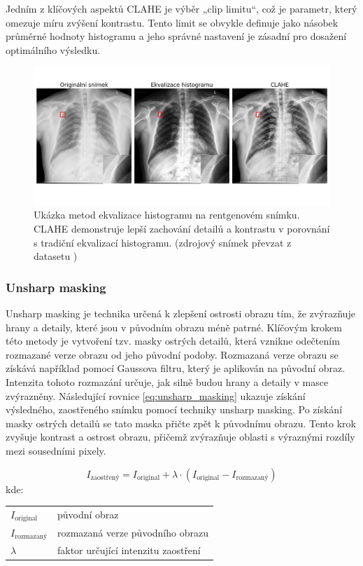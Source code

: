 \documentclass[male,czech,api_ing]{thesis}
\makeatletter
\newenvironment{conditions}[1][kde:]
    {#1 \begin{tabular}[t]{>{$}l<{$} @{${}={}$} >{\raggedright\arraybackslash}p{10cm}}}
    {\end{tabular}}
\makeatother
\begin{document}
Jedním z klíčových aspektů CLAHE je výběr „clip limitu“, což je parametr, který omezuje míru zvýšení kontrastu. Tento limit se obvykle definuje jako násobek průměrné hodnoty histogramu a jeho správné nastavení je zásadní pro dosažení optimálního výsledku. \cite{GraphicsGems}

\begin{figure}[h]
    \centering
    \includegraphics[width=\linewidth]{Prilohy/Obrazky/ImageEnhancement.png}
    \caption{Ukázka metod ekvalizace histogramu na rentgenovém snímku. CLAHE demonstruje lepší zachování detailů a kontrastu v porovnání s tradiční ekvalizací histogramu. (zdrojový snímek převzat z datasetu \cite{LungDataset})}
    \label{fig:histogram_equalization}
\end{figure}

\subsubsection{Unsharp masking}
Unsharp masking je technika určená k zlepšení ostrosti obrazu tím, že zvýrazňuje hrany a detaily, které jsou v původním obrazu méně patrné. Klíčovým krokem této metody je vytvoření tzv. masky ostrých detailů, která vznikne odečtením rozmazané verze obrazu od jeho původní podoby. Rozmazaná verze obrazu se získává například pomocí Gaussova filtru, který je aplikován na původní obraz. Intenzita tohoto rozmazání určuje, jak silně budou hrany a detaily v masce zvýrazněny. Následující rovnice \ref{eq:unsharp_masking} ukazuje získání výsledného, zaostřeného snímku pomocí techniky unsharp masking. Po získání masky ostrých detailů se tato maska přičte zpět k původnímu obrazu. Tento krok zvyšuje kontrast a ostrost obrazu, přičemž zvýrazňuje oblasti s výraznými rozdíly mezi sousedními pixely. \cite{UnsharpMasking}

\begin{equation}
    I_{\text{zaostřený}} = I_{\text{original}} + \lambda \cdot (I_{\text{original}} - I_{\text{rozmazaný}})
    \label{eq:unsharp_masking}
\end{equation}
\begin{conditions}
    I_{\text{original}} & původní obraz \\
    I_{\text{rozmazaný}} & rozmazaná verze původního obrazu \\
    \lambda & faktor určující intenzitu zaostření
\end{conditions}
\end{document}
